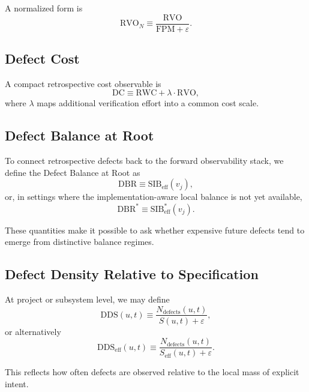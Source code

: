 \documentclass[twocolumn]{aastex701}
\begin{document}
A normalized form is
\begin{equation}
\mathrm{RVO}_N \equiv \frac{\mathrm{RVO}}{\mathrm{FPM}+\varepsilon}.
\end{equation}

\subsection{Defect Cost}

A compact retrospective cost observable is
\begin{equation}
\mathrm{DC} \equiv \mathrm{RWC} + \lambda \cdot \mathrm{RVO},
\end{equation}
where $\lambda$ maps additional verification effort into a common cost scale.

\subsection{Defect Balance at Root}

To connect retrospective defects back to the forward observability stack,
we define the Defect Balance at Root as
\begin{equation}
\mathrm{DBR} \equiv \mathrm{SIB}_{\mathrm{eff}}(v_j),
\end{equation}
or, in settings where the implementation-aware local balance
is not yet available,
\begin{equation}
\mathrm{DBR}^\ast \equiv \mathrm{SIB}_{\mathrm{eff}}^\ast(v_j).
\end{equation}

These quantities make it possible to ask whether expensive future defects
tend to emerge from distinctive balance regimes.

\subsection{Defect Density Relative to Specification}

At project or subsystem level, we may define
\begin{equation}
\mathrm{DDS}(u,t) \equiv
\frac{N_{\mathrm{defects}}(u,t)}{S(u,t)+\varepsilon},
\end{equation}
or alternatively
\begin{equation}
\mathrm{DDS}_{\mathrm{eff}}(u,t) \equiv
\frac{N_{\mathrm{defects}}(u,t)}{S_{\mathrm{eff}}(u,t)+\varepsilon}.
\end{equation}

This reflects how often defects are observed relative to the local mass
of explicit intent.
\end{document}
